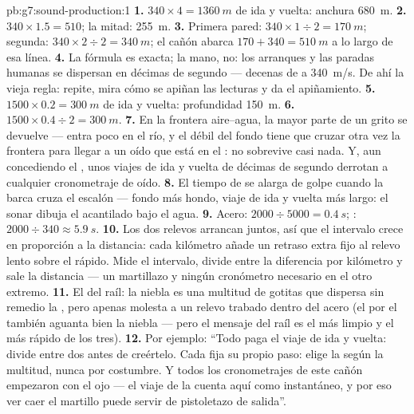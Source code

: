 \begin{solution}{pb:g7:sound-production:1}
\textbf{1.} $340 \times 4 = \qty{1360}{m}$ de ida y vuelta: anchura
\qty{680}{m}.
\textbf{2.} $340 \times 1.5 = 510$; la mitad: \qty{255}{m}.
\textbf{3.} Primera pared: $340 \times 1 \div 2 = \qty{170}{m}$;
segunda: $340 \times 2 \div 2 = \qty{340}{m}$; el cañón abarca $170 +
340 = \qty{510}{m}$ a lo largo de esa línea.
\textbf{4.} La fórmula es exacta; la mano, no: los arranques y las
paradas humanas se dispersan en décimas de segundo --- decenas de
 a \qty{340}{m/s}. De ahí la vieja regla: repite, mira cómo se
apiñan las lecturas y da el apiñamiento.
\textbf{5.} $1500 \times 0.2 = \qty{300}{m}$ de ida y vuelta:
profundidad \qty{150}{m}.
\textbf{6.} $1500 \times 0.4 \div 2 = \qty{300}{m}$.
\textbf{7.} En la frontera aire--agua, la mayor parte de un grito se
devuelve --- entra poco en el río, y el débil  del fondo tiene
que cruzar otra vez la frontera para llegar a un oído que está en el
: no sobrevive casi nada. Y, aun concediendo el , unos
viajes de ida y vuelta de décimas de segundo derrotan a cualquier
cronometraje de oído.
\textbf{8.} El tiempo de  se alarga de golpe cuando la barca
cruza el escalón --- fondo más hondo, viaje de ida y vuelta más largo:
el sonar dibuja el acantilado bajo el agua.
\textbf{9.} Acero: $2000 \div 5000 = \qty{0.4}{s}$; : $2000
\div 340 \approx \qty{5.9}{s}$.
\textbf{10.} Los dos relevos arrancan juntos, así que el intervalo
crece en proporción a la distancia: cada kilómetro añade un retraso
extra fijo al relevo lento sobre el rápido. Mide el intervalo, divide
entre la diferencia por kilómetro y sale la distancia --- un martillazo
y ningún cronómetro necesario en el otro extremo.
\textbf{11.} El  del raíl: la niebla es una multitud de
gotitas que dispersa sin remedio la \emph{}, pero apenas molesta a
un relevo trabado dentro del acero  (el  por el
 también aguanta bien la niebla --- pero el mensaje del raíl es el
más limpio y el más rápido de los tres).
\textbf{12.} Por ejemplo: ``Todo  paga el viaje de ida y
vuelta: divide entre dos antes de creértelo. Cada  fija su
propio paso: elige la  según la multitud, nunca por
costumbre. Y todos los cronometrajes de este cañón empezaron con el
ojo --- el viaje de la  cuenta aquí como instantáneo, y por eso
ver caer el martillo puede servir de pistoletazo de salida''.
\end{solution}
